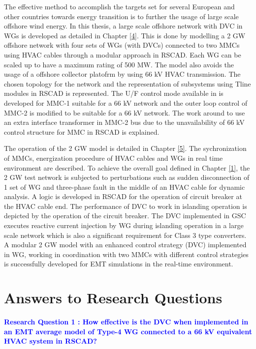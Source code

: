 The effective method to accomplish the targets set for several European and other countries towards energy transition is to further the usage of large scale offshore wind energy. In this thesis, a large scale offshore network with \gls{DVC} in \gls{WG}s is developed as detailed in Chapter \ref{4}. This is done by modelling a 2 GW offshore network with four sets of \gls{WG}s (with \gls{DVC}s) connected to two \gls{MMC}s using \gls{HVAC} cables through a modular approach in RSCAD. Each \gls{WG} can be scaled up to have a maximum rating of 500 MW. The model also avoids the usage of a offshore collector platofrm by using 66 kV \gls{HVAC} transmission. The chosen topology for the network and the representation of subsystems using Tline modules in RSCAD is represented. The U/F control mode available in \cite{wachal2014guide} is developed for \gls{MMC}-1 suitable for a 66 kV network and the outer loop control of \gls{MMC}-2 is modified to be suitable for a 66 kV network. The work around to use an extra interface transformer in \gls{MMC}-2 bus due to the unavailability of 66 kV control structure for \gls{MMC} in RSCAD is explained. 


The operation of the 2 GW model is detailed in Chapter \ref{5}. The sychronization of \gls{MMC}s, energization procedure of \gls{HVAC} cables and \gls{WG}s in real time environment are described. To achieve the overall goal defined in Chapter \ref{1}, the 2 GW test network is subjected to perturbations such as sudden disconnection of 1 set of \gls{WG} and three-phase fault in the middle of an \gls{HVAC} cable for dynamic analysis. A logic is developed in RSCAD for the operation of circuit breaker at the \gls{HVAC} cable end. The performance of \gls{DVC} to work in islanding operation is depicted by the operation of the circuit breaker. The \gls{DVC} implemented in \gls{GSC} executes reactive current injection by \gls{WG} during islanding operation in a large scale network which is also a significant requirement for Class 3 type converters. A modular 2 GW model with an enhanced control strategy (\gls{DVC}) implemented in \gls{WG}, working in coordination with two \gls{MMC}s with different control strategies is successfully developed for \gls{EMT} simulations in the real-time environment.   


\section{Answers to Research Questions}
\vspace{2mm}
\paragraph{\textcolor{blue}{Research Question 1 : How effective is the \gls{DVC} when implemented in an \gls{EMT} average model of Type-4 \gls{WG} connected to a 66 kV equivalent \gls{HVAC} system in RSCAD?}}

